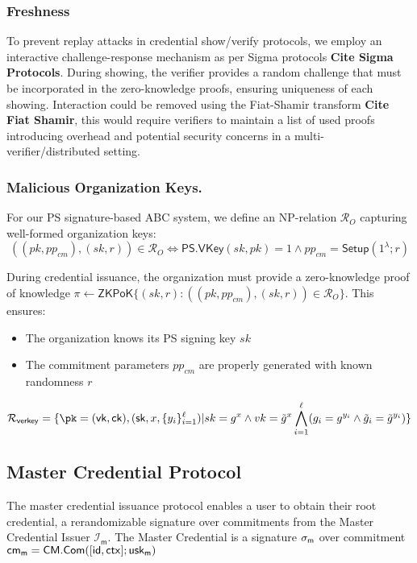 \subsubsection{Freshness}
To prevent replay attacks in credential show/verify protocols, we employ an interactive challenge-response mechanism as per Sigma protocols \textbf{Cite Sigma Protocols}. During showing, the verifier provides a random challenge that must be incorporated in the zero-knowledge proofs, ensuring uniqueness of each showing. Interaction could be removed using the Fiat-Shamir transform \textbf{Cite Fiat Shamir}, this would require verifiers to maintain a list of used proofs introducing overhead and potential security concerns in a multi-verifier/distributed setting.

\subsubsection{Malicious Organization Keys.}
For our PS signature-based ABC system, we define an NP-relation $\mathcal{R}_O$ capturing well-formed organization keys:
$$ ((pk, pp_{cm}), (sk, r)) \in \mathcal{R}_O \iff \mathsf{PS.VKey}(sk, pk) = 1 \land pp_{cm} = \mathsf{Setup}(1^\lambda; r) $$

During credential issuance, the organization must provide a zero-knowledge proof of knowledge 
$\pi \gets \mathsf{ZKPoK}\{(sk,r): ((pk, pp_{cm}), (sk,r)) \in \mathcal{R}_O\}$. 
This ensures:
\begin{itemize}
    \item The organization knows its PS signing key $sk$
    \item The commitment parameters $pp_{cm}$ are properly generated with known randomness $r$
\end{itemize}



        \[
        \mathcal{R}_{\mathsf{verkey}} = \{\pk = (\vk, \ck),(\sk, x, \{y_i\}_{i=1}^\ell) | sk = g^x \wedge vk = \tilde{g}^x \bigwedge_{i=1}^\ell (g_i = g^{y_i} \wedge \tilde{g}_i = \tilde{g}^{y_i})\}
        \]





\newpage
\subsection{Master Credential Protocol}
The master credential issuance protocol enables a user to obtain their root credential, a rerandomizable signature over commitments from the Master Credential Issuer $\mathcal{I}_{\mathsf{m}}.$ The Master Credential is a signature $\sigma_{\mathsf{m}}$ over commitment $\mathsf{cm_m} = \mathsf{CM.Com}([\mathsf{id}, \mathsf{ctx}]; \mathsf{usk_m})$

